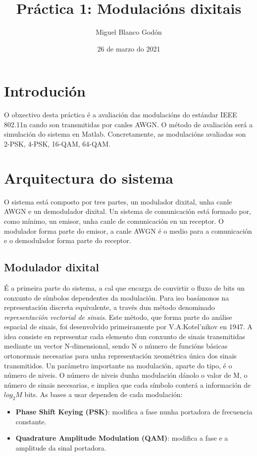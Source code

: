 \documentclass[
	10pt, %
	spanish, %
]{fphw}
\title{Práctica 1: Modulacións dixitais}
\author{Miguel Blanco Godón}
\date{26 de marzo do 2021}
\institute{Universidade da Coruña \\ Facultade de Informática}
\begin{document}
\maketitle 

\section*{Introdución}
O obxectivo desta práctica é a avaliación das modulacións do estándar IEEE 802.11n cando son transmitidas por canles AWGN. O método de avaliación será a simulación do sistema en Matlab.
Concretamente, as modulacións avaliadas son 2-PSK, 4-PSK, 16-QAM, 64-QAM.
\section*{Arquitectura do sistema}
O sistema está composto por tres partes, un modulador dixital, unha canle AWGN e un demodulador dixital. Un sistema de comunicación está formado por, como mínimo, un emisor, unha canle de comunicación en un receptor. O modulador forma parte do emisor, a canle AWGN é o medio para a comunicación e o demodulador forma parte do receptor.
\subsection*{Modulador dixital}
É a primeira parte do sistema, a cal que encarga de convirtir o fluxo de bits un conxunto de símbolos dependentes da modulación. Para iso basámonos na representación discreta equivalente, a través dun método denominado \textit{representación vectorial de sinais}. Este método, que forma parte do análise espacial de sinais, foi desenvolvido primeiramente por V.A.Kotel'nikov en 1947. A idea consiste en representar cada elemento dun conxunto de sinais transmitidas mediante un vector N-dimensional, sendo N o número de funcións básicas ortonormais necesarias para unha representación xeométrica única dos sinais transmitidos.
Un parámetro importante na modulación, aparte do tipo, é o número de niveis. O número de niveis dunha modulación dánolo o valor de M, o número de sinais necesarias, e implica que cada símbolo conterá  a información de $log_2{M}$ bits.
As bases a usar dependen de cada modulación:
\begin{itemize}
\item \textbf{Phase Shift Keying (PSK)}: modifica a fase nunha portadora de frecuencia constante.
\item \textbf{Quadrature Amplitude Modulation (QAM)}: modifica a fase e a amplitude da sinal portadora. 
\end{itemize}
\end{document}
